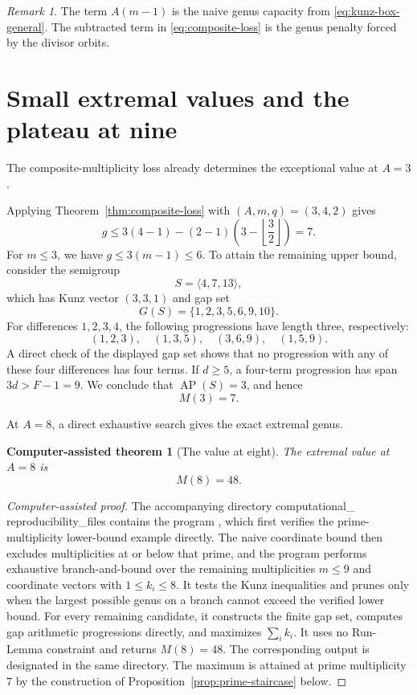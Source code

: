 \documentclass[11pt]{article}
\theoremstyle{plain}
\newtheorem{computertheorem}[theorem]{Computer-assisted theorem}
\theoremstyle{definition}
\theoremstyle{remark}
\newtheorem{remark}[theorem]{Remark}
\newcommand{\AP}{\operatorname{AP}}
\newcommand{\compdir}{{\small\ttfamily computational\_\allowbreak
  reproducibility\_\allowbreak files}}
\begin{document}
\begin{remark}
The term $A(m-1)$ is the naive genus capacity from
\eqref{eq:kunz-box-general}.  The subtracted term in
\eqref{eq:composite-loss} is the genus penalty forced by the divisor orbits.
\end{remark}

\section{Small extremal values and the plateau at nine}
\label{sec:small-values}

The composite-multiplicity loss already determines the exceptional value at
$A=3$.

Applying Theorem~\ref{thm:composite-loss} with $(A,m,q)=(3,4,2)$ gives
\[
  g\leq3(4-1)-(2-1)\left(3-\left\lfloor\frac32\right\rfloor\right)=7.
\]
For $m\leq3$, we have $g\leq3(m-1)\leq6$.  To attain the remaining upper
bound, consider the semigroup
\[
  S=\langle4,7,13\rangle,
\]
which has Kunz vector $(3,3,1)$ and gap set
\[
  G(S)=\{1,2,3,5,6,9,10\}.
\]
For differences $1,2,3,4$, the following progressions have length three,
respectively:
\[
  (1,2,3),\quad(1,3,5),\quad(3,6,9),\quad(1,5,9).
\]
A direct check of the displayed gap set shows that no progression with any
of these four differences has four terms.  If $d\geq5$, a four-term
progression has span $3d>F-1=9$.  We conclude that $\AP(S)=3$, and hence
\begin{equation}\label{eq:M3}
  \boxed{M(3)=7.}
\end{equation}

At $A=8$, a direct exhaustive search gives the exact extremal genus.

\begin{computertheorem}[The value at eight]\label{thm:M8-computation}
The extremal value at $A=8$ is
\[
  \boxed{M(8)=48.}
\]
\end{computertheorem}

\begin{proof}[Computer-assisted proof]
The accompanying directory \compdir{}
contains the program , which first verifies the
prime-multiplicity
lower-bound example directly.  The naive coordinate bound then excludes
multiplicities at or below that prime, and the program performs exhaustive
branch-and-bound over the remaining multiplicities $m\leq9$ and coordinate
vectors with $1\leq k_i\leq8$.  It tests the Kunz inequalities and prunes
only when the largest possible genus on a branch cannot exceed the verified
lower bound.  For every remaining candidate, it constructs the finite gap set,
computes gap arithmetic progressions directly, and maximizes $\sum_i k_i$.
It uses no Run-Lemma constraint and returns $M(8)=48$.  The corresponding
output is designated  in the same directory.
The maximum is attained at prime multiplicity $7$ by the construction of
Proposition~\ref{prop:prime-staircase} below.
\end{proof}
\end{document}
